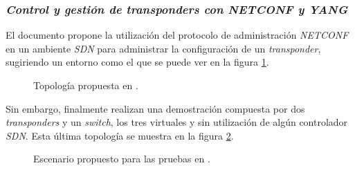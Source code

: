 \subsubsection*{\textit{Control y gestión de transponders con NETCONF y YANG}}

El documento \parencite{netconfsddn} propone la utilización del protocolo de administración \textit{NETCONF} en un ambiente \textit{SDN} para administrar la configuración de un \textit{transponder}, sugiriendo un entorno como el que se puede ver en la figura \ref{fig:netconfsddn1}.


\begin{figure}[H]
	\centering 
	\caption[Topología propuesta en.]{Topología propuesta en \parencite{netconfsddn}.}
	\label{fig:netconfsddn1}
\end{figure}

Sin embargo, finalmente realizan una demostración compuesta por dos \textit{transponders} y un \textit{switch}, los tres virtuales y sin utilización de algún controlador \textit{SDN}. Esta última topología se muestra en la figura \ref{fig:netconfsddn2}.


\begin{figure}[H]
	\centering 
	\caption[Escenario propuesto para las pruebas en.]{Escenario propuesto para las pruebas en \parencite{netconfsddn}.}
	\label{fig:netconfsddn2}
\end{figure}

